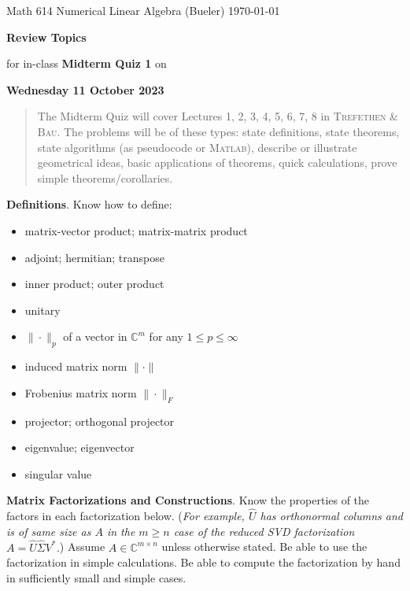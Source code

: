 \documentclass[11pt]{amsart}
\newcommand{\normalspacing}{\renewcommand{\baselinestretch}{1.1}\tiny\normalsize}
\newcommand{\bigspacing}{\renewcommand{\baselinestretch}{1.21}\tiny\normalsize}
\newcommand{\CC}{{\mathbb{C}}}
\newcommand{\Matlab}{\textsc{Matlab}\xspace}
\newcommand{\textbook}{\textsc{Trefethen \& Bau}}
\begin{document}
\scriptsize \noindent Math 614 Numerical Linear Algebra (Bueler) \hfill \today
\thispagestyle{empty}

\bigskip
\Large\centerline{\textbf{Review Topics}}

\Large\centerline{for in-class \textbf{Midterm Quiz 1} on}

\Large\centerline{\textbf{Wednesday 11 October 2023}}

\normalsize
\bigskip
\begin{quote}
The Midterm Quiz will cover Lectures 1, 2, 3, 4, 5, 6, 7, 8 in \textbook.  The problems will be of these types: state definitions, state theorems, state algorithms (as pseudocode or \Matlab), describe or illustrate geometrical ideas, basic applications of theorems, quick calculations, prove simple theorems/corollaries.
\end{quote}
\bigskip

\bigspacing
\noindent \textbf{Definitions}. Know how to define:
\begin{itemize}
\item matrix-vector product; matrix-matrix product
\item adjoint; hermitian; transpose
\item inner product; outer product
\item unitary
\item $\|\cdot\|_p$ of a vector in $\CC^m$ for any $1\le p \le \infty$
\item induced matrix norm $\|\cdot\|$
\item Frobenius matrix norm $\|\cdot\|_F$
\item projector; orthogonal projector
\item eigenvalue; eigenvector
\item singular value
\end{itemize}

\normalspacing

\medskip\noindent \textbf{Matrix Factorizations and Constructions}.  Know the properties of the factors in each factorization below.  (\emph{For example, $\hat U$ has orthonormal columns and is of same size as $A$ in the $m\ge n$ case of the reduced SVD factorization $A=\hat U \hat \Sigma V^*$.})  Assume $A\in \CC^{m\times n}$ unless otherwise stated.  Be able to use the factorization in simple calculations.  Be able to compute the factorization by hand in sufficiently small and simple cases.
\end{document}
